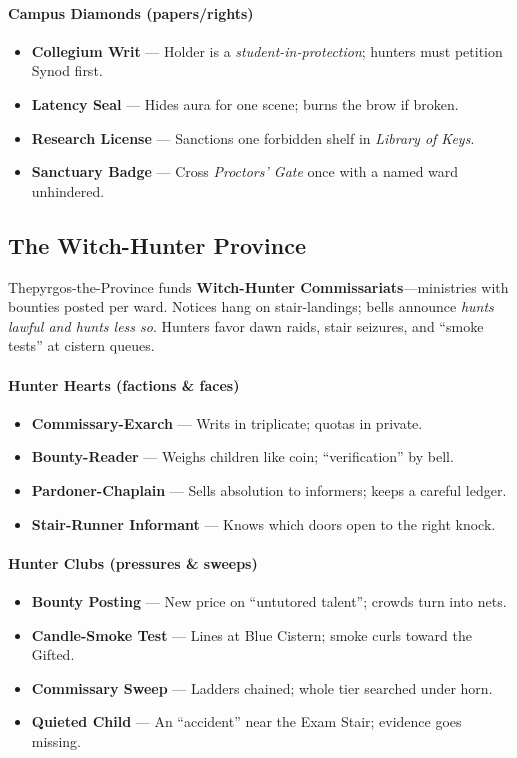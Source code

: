 \paragraph{Campus Diamonds (papers/rights)}
\begin{itemize}
  \item \textbf{Collegium Writ} — Holder is a \emph{student-in-protection}; hunters must petition Synod first.
  \item \textbf{Latency Seal} — Hides aura for one scene; burns the brow if broken.
  \item \textbf{Research License} — Sanctions one forbidden shelf in \emph{Library of Keys}.
  \item \textbf{Sanctuary Badge} — Cross \emph{Proctors’ Gate} once with a named ward unhindered.
\end{itemize}

\subsection*{The Witch-Hunter Province}
\label{sec:thepyrgos-hunters}
Thepyrgos-the-Province funds \textbf{Witch-Hunter Commissariats}—ministries with bounties posted per ward. Notices hang on stair-landings; bells announce \emph{hunts lawful and hunts less so}. Hunters favor dawn raids, stair seizures, and “smoke tests” at cistern queues.

\paragraph{Hunter Hearts (factions \& faces)}
\begin{itemize}
  \item \textbf{Commissary-Exarch} — Writs in triplicate; quotas in private.
  \item \textbf{Bounty-Reader} — Weighs children like coin; “verification” by bell.
  \item \textbf{Pardoner-Chaplain} — Sells absolution to informers; keeps a careful ledger.
  \item \textbf{Stair-Runner Informant} — Knows which doors open to the right knock.
\end{itemize}

\paragraph{Hunter Clubs (pressures \& sweeps)}
\begin{itemize}
  \item \textbf{Bounty Posting} — New price on “untutored talent”; crowds turn into nets.
  \item \textbf{Candle-Smoke Test} — Lines at Blue Cistern; smoke curls toward the Gifted.
  \item \textbf{Commissary Sweep} — Ladders chained; whole tier searched under horn.
  \item \textbf{Quieted Child} — An “accident” near the Exam Stair; evidence goes missing.
\end{itemize}


